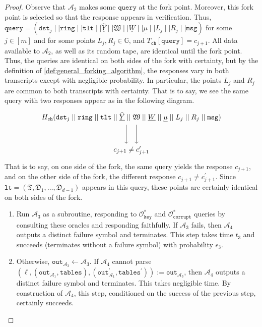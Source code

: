 \documentclass[11pt]{article}
\theoremstyle{definition}
\newcommand{\G}{\mathbb{G}}
\newcommand{\lt}{\texttt{lt}}
\newcommand{\tlt}{\texttt{tlt}}
\newcommand{\ring}{\texttt{ring}}
\newcommand{\msg}{\texttt{msg}}
\newcommand{\corruptionOracle}{\mathcal{O}_{\texttt{corrupt}}}
\newcommand{\keyOracle}{\mathcal{O}_{\texttt{key}}}
\newcommand{\signaturequery}{(\texttt{dst}_{j} \mid \mid \ring \mid \mid \tlt \mid \mid \underline{\widehat{Y}} \mid \mid \mathfrak{W} \mid \mid \underline{W} \mid \mid \underline{\mu} \mid \mid L_{j} \mid \mid R_{j} \mid \mid \msg)}
\begin{document}
\begin{proof}
Observe that $\mathcal{A}_2$ makes some $\texttt{query}$ at the fork point. Moreover, this fork point is selected so that the response appears in verification. Thus, $\texttt{query} = \signaturequery$ for some $j \in [m]$ and for some points $L_j, R_j \in \G$, and $T_{\texttt{ch}}[\texttt{query}] = c_{j+1}$. All data available to $\mathcal{A}_2$, as well as its random tape, are identical until the fork point. Thus, the queries are identical on both sides of the fork with certainty, but by the definition of \cref{def:general_forking_algorithm}, the responses vary in both transcripts except with negligible probability. In particular, the points $L_j$ and $R_j$ are common to both transcripts with certainty.  That is to say, we see the same query with two responses appear as in the following diagram.
\[
\begin{tikzcd}[row sep=large, column sep=0pt] 
    H_{\texttt{ch}}\signaturequery \arrow[d, shift left, shift left, shift left] \arrow[d, shift right, shift right, shift right] \\
    c_{j+1} \neq c^\prime_{j+1}
\end{tikzcd}
\]
That is to say, on one side of the fork, the same query yields the response $c_{j+1}$, and on the other side of the fork, the different response $c_{j+1}\neq c_{j+1}^\prime$.
Since $\lt = (\mathfrak{T}, \mathfrak{D}_1, \ldots, \mathfrak{D}_{d-1})$ appears in this query, these points are certainly identical on both sides of the fork. 
\begin{enumerate}
\item Run $\mathcal{A}_3$ as a subroutine, responding to $\keyOracle^*$ and $\corruptionOracle^*$ queries by consulting these oracles and responding faithfully.  If $\mathcal{A}_3$ fails, then $\mathcal{A}_4$ outputs a distinct failure symbol and terminates. This step takes time $t_3$ and succeeds (terminates without a failure symbol) with probability $\epsilon_3$.

\item Otherwise, $\texttt{out}_{\mathcal{A}_3} \leftarrow \mathcal{A}_3$. If $\mathcal{A}_4$ cannot parse $(\ell, (\texttt{out}_{\mathcal{A}_1}, \texttt{tables}), (\texttt{out}_{\mathcal{A}_1}^\prime, \texttt{tables}^\prime)) := \texttt{out}_{\mathcal{A}_3}$, then $\mathcal{A}_4$ outputs a distinct failure symbol and terminates. This takes negligible time. By construction of $\mathcal{A}_4$, this step, conditioned on the success of the previous step, certainly succeeds.


\end{enumerate}
\end{proof}
\end{document}
